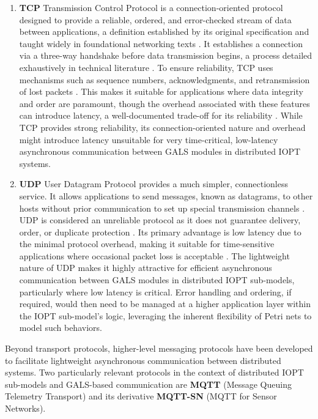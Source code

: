 \begin{enumerate}
    \item \textbf{TCP} Transmission Control Protocol is a connection-oriented protocol designed to provide a reliable, ordered, and error-checked stream of data between applications, a definition established by its original specification \cite{rfc793} and taught widely in foundational networking texts \cite{kurose2021}. It establishes a connection via a three-way handshake before data transmission begins, a process detailed exhaustively in technical literature \cite{stevens1994}. To ensure reliability, TCP uses mechanisms such as sequence numbers, acknowledgments, and retransmission of lost packets \cite{rfc793}. This makes it suitable for applications where data integrity and order are paramount, though the overhead associated with these features can introduce latency, a well-documented trade-off for its reliability \cite{kurose2021, stevens1994}. While TCP provides strong reliability, its connection-oriented nature and overhead might introduce latency unsuitable for very time-critical, low-latency asynchronous communication between GALS modules in distributed IOPT systems.
    \item \textbf{UDP} User Datagram Protocol provides a much simpler, connectionless service. It allows applications to send messages, known as datagrams, to other hosts without prior communication to set up special transmission channels \cite{rfc768}. UDP is considered an unreliable protocol as it does not guarantee delivery, order, or duplicate protection \cite{kurose2021}. Its primary advantage is low latency due to the minimal protocol overhead, making it suitable for time-sensitive applications where occasional packet loss is acceptable \cite{forouzan2010}. The lightweight nature of UDP makes it highly attractive for efficient asynchronous communication between GALS modules in distributed IOPT sub-models, particularly where low latency is critical. Error handling and ordering, if required, would then need to be managed at a higher application layer within the IOPT sub-model's logic, leveraging the inherent flexibility of Petri nets to model such behaviors. 

\end{enumerate}


Beyond transport protocols, higher-level messaging protocols have been developed to facilitate lightweight asynchronous communication between distributed systems. Two particularly relevant protocols in the context of distributed IOPT sub-models and GALS-based communication are \textbf{MQTT} (Message Queuing Telemetry Transport) and its derivative \textbf{MQTT-SN} (MQTT for Sensor Networks).
 
